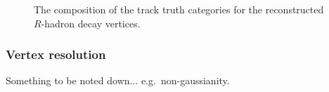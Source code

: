 \documentclass[NOTE, atlasdraft=true, texlive=2018, UKenglish]{\ATLASLATEXPATH atlasdoc}
\begin{document}
\begin{figure}[tbp]
\begin{center}
\caption{The composition of the track truth categories for the reconstructed $R$-hadron decay vertices.}
\label{fig:Rhadron_trackType}
\end{center}
\end{figure}

\subsubsection{Vertex resolution}
Something to be noted down... e.g.~non-gaussianity.
\end{document}
